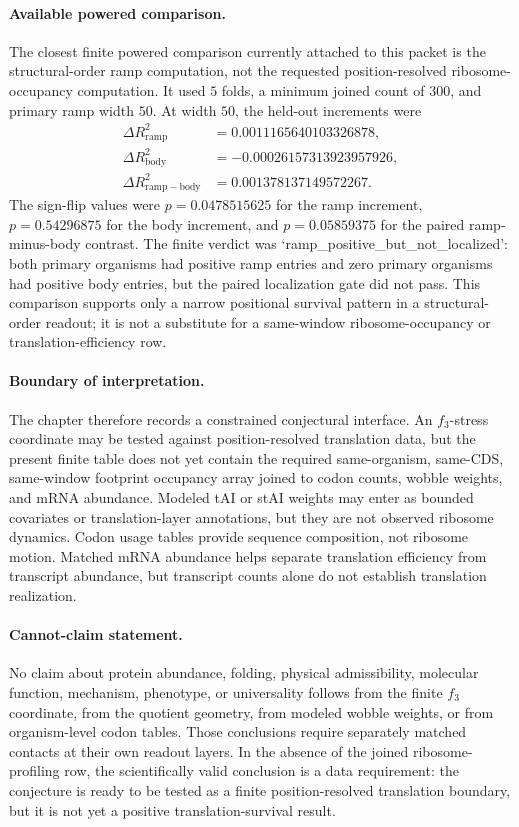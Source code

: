 \paragraph{Available powered comparison.}
The closest finite powered comparison currently attached to this packet is the structural-order ramp computation, not the requested position-resolved ribosome-occupancy computation.  It used $5$ folds, a minimum joined count of $300$, and primary ramp width $50$.  At width $50$, the held-out increments were
$$
\begin{aligned}
\Delta R^2_{\mathrm{ramp}}&=0.0011165640103326878,\\
\Delta R^2_{\mathrm{body}}&=-0.00026157313923957926,\\
\Delta R^2_{\mathrm{ramp-body}}&=0.001378137149572267.
\end{aligned}
$$
The sign-flip values were $p=0.0478515625$ for the ramp increment, $p=0.54296875$ for the body increment, and $p=0.05859375$ for the paired ramp-minus-body contrast.  The finite verdict was `ramp\_positive\_but\_not\_localized': both primary organisms had positive ramp entries and zero primary organisms had positive body entries, but the paired localization gate did not pass.  This comparison supports only a narrow positional survival pattern in a structural-order readout; it is not a substitute for a same-window ribosome-occupancy or translation-efficiency row.

\paragraph{Boundary of interpretation.}
The chapter therefore records a constrained conjectural interface.  An $f_3$-stress coordinate may be tested against position-resolved translation data, but the present finite table does not yet contain the required same-organism, same-CDS, same-window footprint occupancy array joined to codon counts, wobble weights, and mRNA abundance.  Modeled tAI or stAI weights may enter as bounded covariates or translation-layer annotations, but they are not observed ribosome dynamics.  Codon usage tables provide sequence composition, not ribosome motion.  Matched mRNA abundance helps separate translation efficiency from transcript abundance, but transcript counts alone do not establish translation realization.

\paragraph{Cannot-claim statement.}
No claim about protein abundance, folding, physical admissibility, molecular function, mechanism, phenotype, or universality follows from the finite $f_3$ coordinate, from the quotient geometry, from modeled wobble weights, or from organism-level codon tables.  Those conclusions require separately matched contacts at their own readout layers.  In the absence of the joined ribosome-profiling row, the scientifically valid conclusion is a data requirement: the conjecture is ready to be tested as a finite position-resolved translation boundary, but it is not yet a positive translation-survival result.


